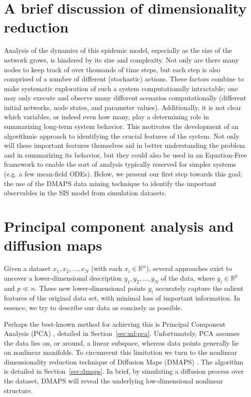 \section{A brief discussion of dimensionality reduction}

Analysis of the dynamics of this epidemic model, especially as the
size of the network grows, is hindered by its size and complexity. Not
only are there many nodes to keep track of over thousands of time
steps, but each step is also comprised of a number of different
(stochastic) actions. These factors combine to make systematic
exploration of such a system computationally intractable; one may only
execute and observe many different scenarios computationally
(different initial networks, node states, and parameter
values). Additionally, it is not clear which variables, or indeed even
how many, play a determining role in summarizing long-term system
behavior. This motivates the development of an algorithmic approach to
identifying the crucial features of the system. Not only will these
important features themselves aid in better understanding the problem
and in summarizing its behavior, but they could also be used in an
Equation-Free framework to enable the sort of analysis typically
reserved for simpler systems (e.g. a few mean-field ODEs). Below, we
present our first step towards this goal: the use of the DMAPS data
mining technique to identify the important observables in the SIS
model from simulation datasets.

\section{Principal component analysis and diffusion maps}

Given a dataset ${x_1, x_2, \dots, x_N}$ (with each
$x_i \in \mathbb{R}^n$), several approaches exist to uncover a
lower-dimensional description ${y_1, y_2, \dots, y_N}$ of the data,
where $y_i \in \mathbb{R}^p$ and $p \ll n$. These new
lower-dimensional points $y_i$ accurately capture the salient features
of the original data set, with minimal loss of important
information. In essence, we try to describe our data as concisely as
possible.

Perhaps the best-known method for achieving this is Principal
Component Analysis (PCA) \cite{jolliffe_principal_2014}, detailed in
Section~\ref{sec:ml:pca}. Unfortunately, PCA assumes the data lies on,
or around, a linear subspace, whereas data points generally lie on
nonlinear manifolds. To circumvent this limitation we turn to the
nonlinear dimensionality reduction technique of Diffusion Maps (DMAPS)
\cite{coifman_diffusion_2006}. The algorithm is detailed in
Section~\ref{sec:dmaps}. In brief, by simulating a diffusion process
over the dataset, DMAPS will reveal the underlying low-dimensional
nonlinear structure.

